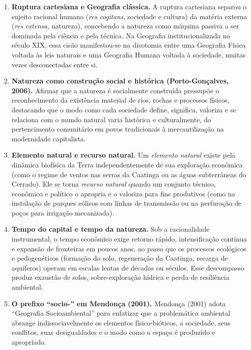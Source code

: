 \clearpage
{}

\begin{boxGabarito}
\begin{enumerate}[leftmargin=1.8em, itemsep=4pt]
  \item \textbf{Ruptura cartesiana e Geografia clássica.} A ruptura cartesiana separou o sujeito racional humano (\emph{res cogitans}, sociedade e cultura) da matéria externa (\emph{res extensa}, natureza), concebendo a natureza como máquina passiva a ser dominada pela ciência e pela técnica. Na Geografia institucionalizada no século XIX, essa cisão manifestou-se na dicotomia entre uma Geografia Física voltada às leis naturais e uma Geografia Humana voltada à sociedade, muitas vezes desconectadas entre si.

  \item \textbf{Natureza como construção social e histórica (Porto-Gonçalves, 2006).} Afirmar que a natureza é socialmente construída pressupõe o reconhecimento da existência material de rios, rochas e processos físicos, destacando que o modo como cada sociedade define, significa, valoriza e se relaciona com o mundo natural varia histórica e culturalmente, do pertencimento comunitário em povos tradicionais à mercantilização na modernidade capitalista.

  \item \textbf{Elemento natural e recurso natural.} Um \emph{elemento natural} existe pela dinâmica biofísica da Terra independentemente de sua exploração econômica (como o regime de ventos nas serras da Caatinga ou as águas subterrâneas do Cerrado). Ele se torna \emph{recurso natural} quando um conjunto técnico, econômico e político o apropria e o valoriza para fins produtivos (como na instalação de parques eólicos com linhas de transmissão ou na perfuração de poços para irrigação mecanizada).

  \item \textbf{Tempo do capital e tempo da natureza.} Sob a racionalidade instrumental, o tempo econômico exige retorno rápido, intensificação contínua e expansão de fronteiras em poucos anos, ao passo que os processos ecológicos e pedogenéticos (formação do solo, regeneração da Caatinga, recarga de aquíferos) operam em escalas lentas de décadas ou séculos. Esse descompasso produz exaustão de solos, sobre-exploração hídrica e perda de resiliência ambiental.

  \item \textbf{O prefixo ``socio-'' em Mendonça (2001).} Mendonça (2001) adota ``Geografia Socioambiental'' para enfatizar que a problemática ambiental abrange indissociavelmente os elementos físico-bióticos, a sociedade, seus conflitos, suas desigualdades e o modo como o espaço é produzido e apropriado.
\end{enumerate}
\end{boxGabarito}

